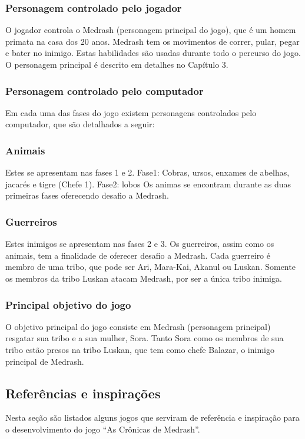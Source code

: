 \subsubsection{Personagem controlado pelo jogador}
O jogador controla o Medrash (personagem principal do jogo), que é um 
homem primata na casa dos 20 anos. Medrash tem os movimentos de correr, pular, 
pegar e bater no inimigo. Estas habilidades são usadas durante todo o percurso do jogo. 
O personagem principal é descrito em detalhes no Capítulo 3.

\subsubsection{Personagem controlado pelo computador}
Em cada uma das fases do jogo existem personagens controlados pelo computador, que 
são detalhados a seguir:


\subsubsection{Animais}
Estes se apresentam nas fases 1 e 2.
Fase1: Cobras, ursos, enxames de abelhas, jacarés e tigre (Chefe 1).
Fase2: lobos
Os animas se encontram durante as duas primeiras fases oferecendo desafio a Medrash. 

\subsubsection{Guerreiros}
Estes inimigos se apresentam nas fases 2 e 3. Os guerreiros, assim como os animais, 
tem a finalidade de oferecer desafio a Medrash. Cada guerreiro é membro de uma tribo, 
que pode ser Ari, Mara-Kai, Akanul ou Luskan. Somente os membros da tribo Luskan atacam 
Medrash, por ser a única tribo inimiga. 

\subsubsection{Principal objetivo do jogo}
O objetivo principal do jogo consiste em Medrash (personagem principal) resgatar 
sua tribo e a sua mulher, Sora. Tanto Sora como os membros de sua tribo 
estão presos na tribo Luskan, que tem como chefe Balazar, o inimigo principal de Medrash. 

\subsection{Referências e inspirações}
Nesta seção são listados alguns jogos que serviram de referência e inspiração 
para o desenvolvimento do jogo ``As Crônicas de Medrash''.

